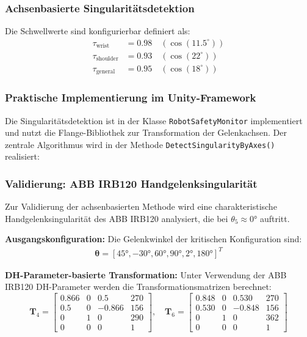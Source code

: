\subsubsection{Achsenbasierte Singularitätsdetektion}
\label{alg:singularity_detection}
Die Schwellwerte sind konfigurierbar definiert als:
\begin{align}
    \tau_{\text{wrist}}    & = 0.98 \quad (\cos(11.5^\circ)) \\
    \tau_{\text{shoulder}} & = 0.93 \quad (\cos(22^\circ))   \\
    \tau_{\text{general}}  & = 0.95 \quad (\cos(18^\circ))
\end{align}

\subsubsection{Praktische Implementierung im Unity-Framework}
\label{sssec:Unity_Implementierung}

Die Singularitätsdetektion ist in der Klasse \texttt{RobotSafetyMonitor}
implementiert und nutzt die Flange-Bibliothek zur Transformation der
Gelenkachsen. Der zentrale Algorithmus wird in der Methode
\texttt{DetectSingularityByAxes()} realisiert:

\subsubsection{Validierung: ABB IRB120 Handgelenksingularität}
\label{sssec:Beispiel_IRB120}

Zur Validierung der achsenbasierten Methode wird eine charakteristische
Handgelenksingularität des ABB IRB120 analysiert, die bei $\theta_5 \approx 0°$
auftritt.

\textbf{Ausgangskonfiguration:}
Die Gelenkwinkel der kritischen Konfiguration sind:
\begin{align}
    \boldsymbol{\theta} = [45°, -30°, 60°, 90°, 2°, 180°]^T
\end{align}

\textbf{DH-Parameter-basierte Transformation:}
Unter Verwendung der ABB IRB120 DH-Parameter werden die Transformationsmatrizen berechnet:
\begin{equation}
    \mathbf{T}_4 = \begin{bmatrix}
        0.866 & 0 & 0.5    & 270 \\
        0.5   & 0 & -0.866 & 156 \\
        0     & 1 & 0      & 290 \\
        0     & 0 & 0      & 1
    \end{bmatrix}, \quad
    \mathbf{T}_6 = \begin{bmatrix}
        0.848 & 0 & 0.530  & 270 \\
        0.530 & 0 & -0.848 & 156 \\
        0     & 1 & 0      & 362 \\
        0     & 0 & 0      & 1
    \end{bmatrix}
\end{equation}

